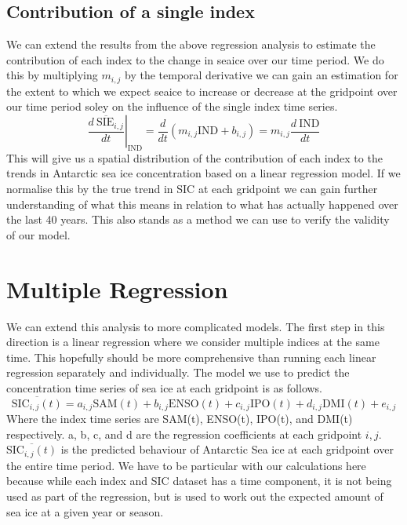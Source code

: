 \documentclass[../main.tex]{subfiles}
\begin{document}
\subsection{Contribution of a single index}
We can extend the results from the above regression analysis to estimate the contribution of each index to the change in seaice over our time period. We do this by multiplying $m_{i,j}$ by the temporal derivative we can gain an estimation for the extent to which we expect seaice to increase or decrease at the gridpoint over our time period soley on the influence of the single index time series.
$$
\left. \overline{\frac{d\  \text{SIE}_{i,j}}{dt}}\right|_{\text{IND}} = \frac{d}{dt} \left(m_{i,j}  \text{IND} + b_{i,j}\right) = m_{i,j}  \frac{d\ \text{IND}}{dt}
$$
This will give us a spatial distribution of the contribution of each index to the trends in Antarctic sea ice concentration based on a linear regression model. If we normalise this by the true trend in SIC at each gridpoint we can gain further understanding of what this means in relation to what has actually happened over the last 40 years. This also stands as a method we can use to verify the validity of our model.

\section{Multiple Regression}

We can extend this analysis to more complicated models. The first step in this direction is a linear regression where we consider multiple indices at the same time. This hopefully should be more comprehensive than running each linear regression separately and individually. The model we use to predict the concentration time series of sea ice at each gridpoint is as follows.
$$
\overline{\text{SIC}_{i,j}\left(t\right)} = a_{i,j} \text{SAM}\left(t\right) + b_{i,j} \text{ENSO}\left(t\right) + c_{i,j} \text{IPO}\left(t\right)+ d_{i,j} \text{DMI}\left(t\right) + e_{i,j}
$$
Where the index time series are SAM(t), ENSO(t), IPO(t), and DMI(t) respectively. a, b, c, and d are the regression coefficients at each gridpoint $i, j$. $\overline{\text{SIC}_{i,j}\left(t\right)}$ is the predicted behaviour of Antarctic Sea ice at each gridpoint over the entire time period. We have to be particular with our calculations here because while each index and SIC dataset has a time component, it is not being used as part of the regression, but is used to work out the expected amount of sea ice at a given year or season.
\end{document}
